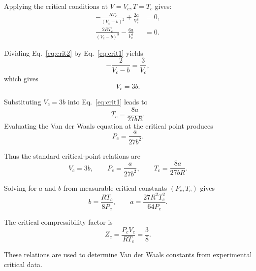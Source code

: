 \documentclass[journal]{IEEEtran}
\begin{document}
Applying the critical conditions at $V=V_c, T=T_c$ gives:
\begin{align}
-\frac{RT_c}{(V_c-b)^2} + \frac{2a}{V_c^3} &= 0, \label{eq:crit1}\\
\frac{2RT_c}{(V_c-b)^3} - \frac{6a}{V_c^4} &= 0. \label{eq:crit2}
\end{align}

Dividing Eq.~\eqref{eq:crit2} by Eq.~\eqref{eq:crit1} yields
\begin{equation}
-\frac{2}{V_c-b} = \frac{3}{V_c},
\end{equation}
which gives
\begin{equation}
V_c = 3b.
\end{equation}

Substituting $V_c=3b$ into Eq.~\eqref{eq:crit1} leads to
\begin{equation}
T_c = \frac{8a}{27bR}.
\end{equation}
Evaluating the Van der Waals equation at the critical point produces
\begin{equation}
P_c = \frac{a}{27b^2}.
\end{equation}

Thus the standard critical-point relations are
\begin{equation}
V_c = 3b,\qquad P_c = \frac{a}{27b^2},\qquad T_c = \frac{8a}{27bR}.
\end{equation}

Solving for $a$ and $b$ from measurable critical constants $(P_c,T_c)$ gives
\begin{equation}
b = \frac{R T_c}{8P_c},\qquad a = \frac{27R^2 T_c^2}{64P_c}.
\end{equation}

The critical compressibility factor is
\begin{equation}
Z_c = \frac{P_c V_c}{R T_c} = \frac{3}{8}.
\end{equation}

These relations are used to determine Van der Waals constants from experimental critical data.
\end{document}
